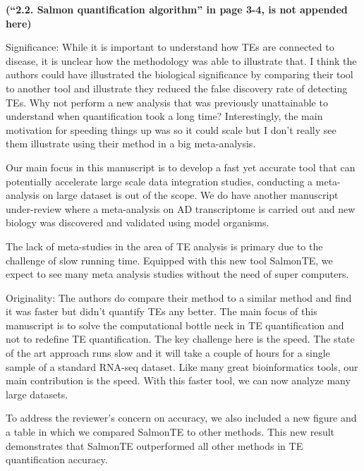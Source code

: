 \documentclass[10pt]{article}
\begin{document}
\begin{response}
\noindent\textbf{(``2.2. Salmon quantification algorithm'' in page 3-4, is not appended here)}

\end{response}

\begin{response}{Significance: While it is important to understand how TEs are connected to disease, it is unclear how the methodology was able to illustrate that. I think the authors could have illustrated the biological significance by comparing their tool to another tool and illustrate they reduced the false discovery rate of detecting TEs. Why not perform a new analysis that was previously unattainable to understand when quantification took a long time? Interestingly, the main motivation for speeding things up was so it could scale but I don’t really see them illustrate using their method in a big meta-analysis. }


    Our main focus in this manuscript is to develop a fast yet accurate tool that can potentially accelerate large scale data integration studies,  conducting a meta-analysis  
     on large dataset is out of the scope.  We do have another manuscript under-review where a meta-analysis on AD transcriptome is carried out and new biology was discovered and validated using model organisms.  

The lack of meta-studies in the area of TE analysis is primary due to the challenge of slow running time.  Equipped with this new tool SalmonTE, we expect to see many meta analysis studies without the need of super computers. 
\end{response}

\begin{response}{Originality: The authors do compare their method to a similar method and find it was faster but didn’t quantify TEs any better.}
The main focus of this manuscript is to solve the computational bottle neck in TE quantification and not to redefine TE quantification.
The key challenge here is the speed.  The state of the art approach runs slow and it will take a couple of hours for a single sample of a standard RNA-seq dataset. 
Like many great bioinformatics tools, our main contribution is the speed.  With this faster tool, we can now analyze many large datasets. 

To address the reviewer's concern on accuracy, we also included a new figure and a table in which we compared SalmonTE to other methods.  
This new result demonstrates that SalmonTE outperformed all other methods in TE quantification accuracy. 
\end{response}
\end{document}
